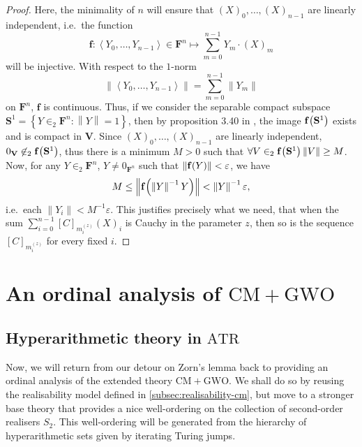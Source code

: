 \documentclass[11pt]{article}
\theoremstyle{plain}
\theoremstyle{definition}
\newcommand{\tuple}[1]{\left\langle #1 \right\rangle}
\begin{document}
\begin{proof}
    Here, the minimality of $n$ will ensure that $\left(X\right)_0, \ldots, \left(X\right)_{n - 1}$ are linearly independent, i.e.\ the function
    \[\mathbf{f} : \tuple{Y_0, \ldots, Y_{n - 1}} \in \mathbf{F}^n \mapsto \sum_{m = 0}^{n - 1} Y_m \cdot \left(X\right)_m\]
    will be injective. With respect to the $1$-norm
    \[\left\|\tuple{Y_0, \ldots, Y_{n - 1}}\right\| = \sum_{m = 0}^{n - 1} \left\|Y_m\right\|\]
    on $\mathbf{F}^n$, $\mathbf{f}$ is continuous. Thus, if we consider the separable compact subspace $\mathbf{S}^1 = \left\{Y \in_2 \mathbf{F}^n : \left\|Y\right\| = 1\right\}$, then by proposition 3.40 in \cite{weaver09-cm}, the image $\mathbf{f}\mleft(\mathbf{S}^1\mright)$ exists and is compact in $\mathbf{V}$. Since $\left(X\right)_0, \ldots, \left(X\right)_{n - 1}$ are linearly independent, $0_\mathbf{V} \not\in_2 \mathbf{f}\mleft(\mathbf{S}^1\mright)$, thus there is a minimum $M > 0$ such that $\forall V \in_2 \mathbf{f}\mleft(\mathbf{S}^1\mright) \left\|V\right\| \geq M$. Now, for any $Y \in_2 \mathbf{F}^n$, $Y \neq 0_{\mathbf{F}^n}$ such that $\left\|\mathbf{f}\mleft(Y\mright)\right\| < \varepsilon$, we have
    \[M \leq \left\|\mathbf{f}\mleft(\left\|Y\right\|^{-1} Y\mright)\right\| < \left\|Y\right\|^{-1} \varepsilon,\]
    i.e.\ each $\left\|Y_i\right\| < M^{-1} \varepsilon$. This justifies precisely what we need, that when the sum $\sum_{i = 0}^{n - 1} \left[C\right]_{m^{\left(z\right)}_i} \left(X\right)_i$ is Cauchy in the parameter $z$, then so is the sequence $\left[C\right]_{m^{\left(z\right)}_i}$ for every fixed $i$.
\end{proof}

\section{An ordinal analysis of \texorpdfstring{$\mathrm{CM} + \mathrm{GWO}$}{CM + GWO}}
\label{sec:cm-gwo-ordinal-analysis}

\subsection{Hyperarithmetic theory in \texorpdfstring{$\mathrm{ATR}$}{ATR}}
\label{subsec:hyperarithmetic}

Now, we will return from our detour on Zorn's lemma back to providing an ordinal analysis of the extended theory $\mathrm{CM} + \mathrm{GWO}$. We shall do so by reusing the realisability model defined in \autoref{subsec:realisability-cm}, but move to a stronger base theory that provides a nice well-ordering on the collection of second-order realisers $S_2$. This well-ordering will be generated from the hierarchy of hyperarithmetic sets given by iterating Turing jumps.
\end{document}
